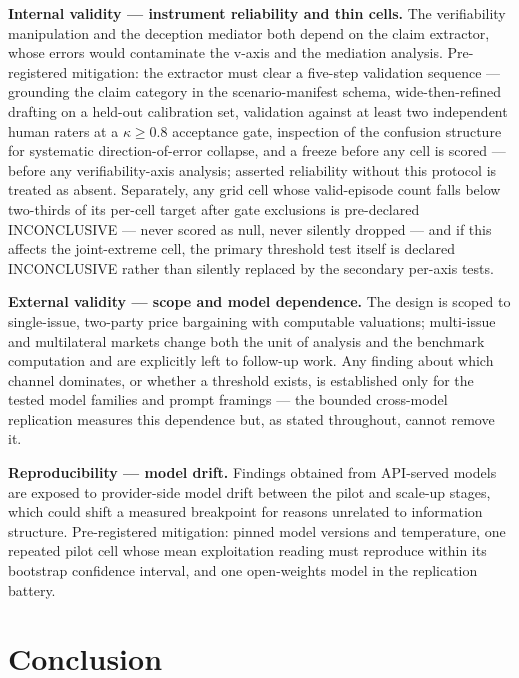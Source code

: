 \documentclass[11pt]{article}
\begin{document}
\noindent\textbf{Internal validity --- instrument reliability and thin cells.} The verifiability manipulation and the deception mediator both depend on the claim extractor, whose errors would contaminate the v-axis and the mediation analysis. Pre-registered mitigation: the extractor must clear a five-step validation sequence --- grounding the claim category in the scenario-manifest schema, wide-then-refined drafting on a held-out calibration set, validation against at least two independent human raters at a $\kappa \geq 0.8$ acceptance gate, inspection of the confusion structure for systematic direction-of-error collapse, and a freeze before any cell is scored --- before any verifiability-axis analysis; asserted reliability without this protocol is treated as absent. Separately, any grid cell whose valid-episode count falls below two-thirds of its per-cell target after gate exclusions is pre-declared INCONCLUSIVE --- never scored as null, never silently dropped --- and if this affects the joint-extreme cell, the primary threshold test itself is declared INCONCLUSIVE rather than silently replaced by the secondary per-axis tests.

\noindent\textbf{External validity --- scope and model dependence.} The design is scoped to single-issue, two-party price bargaining with computable valuations; multi-issue and multilateral markets change both the unit of analysis and the benchmark computation and are explicitly left to follow-up work. Any finding about which channel dominates, or whether a threshold exists, is established only for the tested model families and prompt framings --- the bounded cross-model replication measures this dependence but, as stated throughout, cannot remove it.

\noindent\textbf{Reproducibility --- model drift.} Findings obtained from API-served models are exposed to provider-side model drift between the pilot and scale-up stages, which could shift a measured breakpoint for reasons unrelated to information structure. Pre-registered mitigation: pinned model versions and temperature, one repeated pilot cell whose mean exploitation reading must reproduce within its bootstrap confidence interval, and one open-weights model in the replication battery.

\section{Conclusion}
\end{document}
